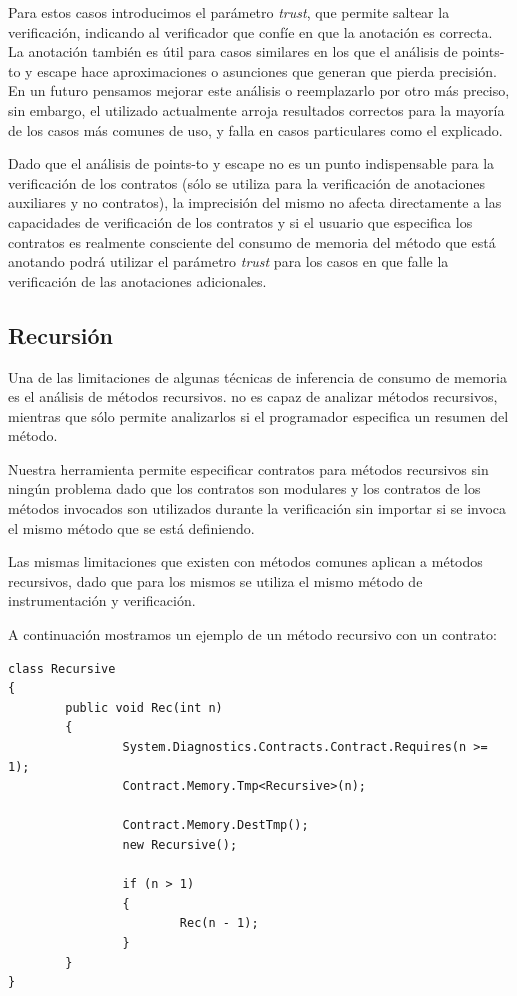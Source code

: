 \documentclass[12pt,a4paper]{article}
\begin{document}
			Para estos casos introducimos el parámetro \textit{trust}, que permite saltear la verificación, indicando al verificador que confíe en que la anotación es correcta. La anotación también es útil para casos similares en los que el análisis de points-to y escape hace aproximaciones o asunciones que generan que pierda precisión. En un futuro pensamos mejorar este análisis o reemplazarlo por otro más preciso, sin embargo, el utilizado actualmente arroja resultados correctos para la mayoría de los casos más comunes de uso, y falla en casos particulares como el explicado.

			Dado que el análisis de points-to y escape no es un punto indispensable para la verificación de los contratos (sólo se utiliza para la verificación de anotaciones auxiliares y no contratos), la imprecisión del mismo no afecta directamente a las capacidades de verificación de los contratos y si el usuario que especifica los contratos es realmente consciente del consumo de memoria del método que está anotando podrá utilizar el parámetro \textit{trust} para los casos en que falle la verificación de las anotaciones adicionales.
		\subsection{Recursión}
			Una de las limitaciones de algunas técnicas de inferencia de consumo de memoria es el análisis de métodos recursivos. \cite{Gar07} no es capaz de analizar métodos recursivos, mientras que \cite{Rou09} sólo permite analizarlos si el programador especifica un resumen del método.

			Nuestra herramienta permite especificar contratos para métodos recursivos sin ningún problema dado que los contratos son modulares y los contratos de los métodos invocados son utilizados durante la verificación sin importar si se invoca el mismo método que se está definiendo.

			Las mismas limitaciones que existen con métodos comunes aplican a métodos recursivos, dado que para los mismos se utiliza el mismo método de instrumentación y verificación.

			A continuación mostramos un ejemplo de un método recursivo con un contrato:

			\vspace{15pt}
			\begin{small}
			\begin{lstlisting}[caption=Clase con método recursivo y contrato]
class Recursive
{
		public void Rec(int n)
		{
				System.Diagnostics.Contracts.Contract.Requires(n >= 1);
				Contract.Memory.Tmp<Recursive>(n);

				Contract.Memory.DestTmp();
				new Recursive();

				if (n > 1)
				{
						Rec(n - 1);
				}
		}
}
			\end{lstlisting}
			\end{small}
\end{document}
